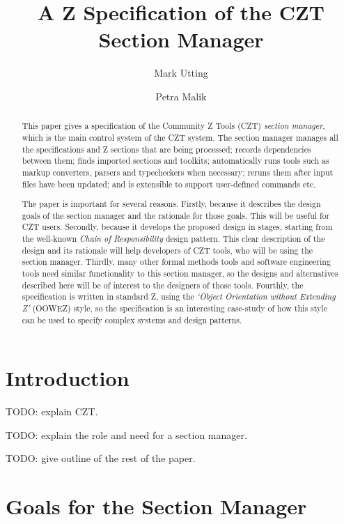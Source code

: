 \documentclass{llncs} %
\title{A Z Specification of the CZT Section Manager}
\author{Mark Utting  %
        \and Petra Malik  %
}
\institute{The University of Waikato, Hamilton, NZ\\
        \email{\{marku,petra\}@cs.waikato.ac.nz}
\\[2ex] $ID: Sat 16 Oct 2004$ %
}
\begin{document}
\maketitle

\begin{abstract}
  This paper gives a specification of the Community Z Tools
  (CZT) \emph{section manager}, which is the main control system of the
  CZT system.  The section manager manages all the specifications and Z
  sections that are being processed; records dependencies between them;
  finds imported sections and toolkits; automatically runs tools such as
  markup converters, parsers and typecheckers when necessary; reruns them
  after input files have been updated; and is extensible to support
  user-defined commands etc.  

  The paper is important for several reasons.  
  Firstly, because it describes the design goals of the section manager and
  the rationale for those goals.  This will be useful for CZT users.
  Secondly, because it develops the proposed design in stages, starting
  from the well-known \emph{Chain of Responsibility} design pattern.  This
  clear description of the design and its rationale will help developers of
  CZT tools, who will be using the section manager.
  Thirdly, many other formal methods tools and software engineering tools
  need similar functionality to this section manager, so the designs and
  alternatives described here will be of interest to the designers of those
  tools.
  Fourthly, the specification is written in standard Z, using the
  \emph{`Object Orientation without Extending Z'} (OOWEZ) style, so the
  specification is an interesting case-study of how this style can be used
  to specify complex systems and design patterns.
\end{abstract}

\section{Introduction}

TODO: explain CZT.

TODO: explain the role and need for a section manager.

TODO: give outline of the rest of the paper.


\section{Goals for the Section Manager}
\end{document}
